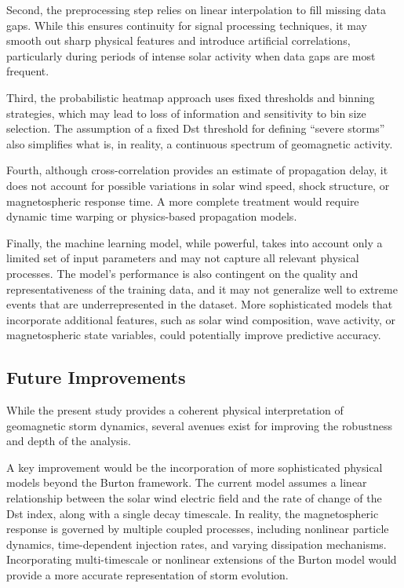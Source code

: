 \documentclass[12pt]{article}
\begin{document}
Second, the preprocessing step relies on linear interpolation to fill missing data gaps. While this ensures continuity for signal processing techniques, it may smooth out sharp physical features and introduce artificial correlations, particularly during periods of intense solar activity when data gaps are most frequent.

Third, the probabilistic heatmap approach uses fixed thresholds and binning strategies, which may lead to loss of information and sensitivity to bin size selection. The assumption of a fixed Dst threshold for defining “severe storms” also simplifies what is, in reality, a continuous spectrum of geomagnetic activity.

Fourth, although cross-correlation provides an estimate of propagation delay, it does not account for possible variations in solar wind speed, shock structure, or magnetospheric response time. A more complete treatment would require dynamic time warping or physics-based propagation models.

Finally, the machine learning model, while powerful, takes into account only a limited set of input parameters and may not capture all relevant physical processes. The model's performance is also contingent on the quality and representativeness of the training data, and it may not generalize well to extreme events that are underrepresented in the dataset. More sophisticated models that incorporate additional features, such as solar wind composition, wave activity, or magnetospheric state variables, could potentially improve predictive accuracy.

\subsection{Future Improvements}

While the present study provides a coherent physical interpretation of geomagnetic storm dynamics, several avenues exist for improving the robustness and depth of the analysis.

A key improvement would be the incorporation of more sophisticated physical models beyond the Burton framework. The current model assumes a linear relationship between the solar wind electric field and the rate of change of the Dst index, along with a single decay timescale. In reality, the magnetospheric response is governed by multiple coupled processes, including nonlinear particle dynamics, time-dependent injection rates, and varying dissipation mechanisms. Incorporating multi-timescale or nonlinear extensions of the Burton model would provide a more accurate representation of storm evolution.
\end{document}
